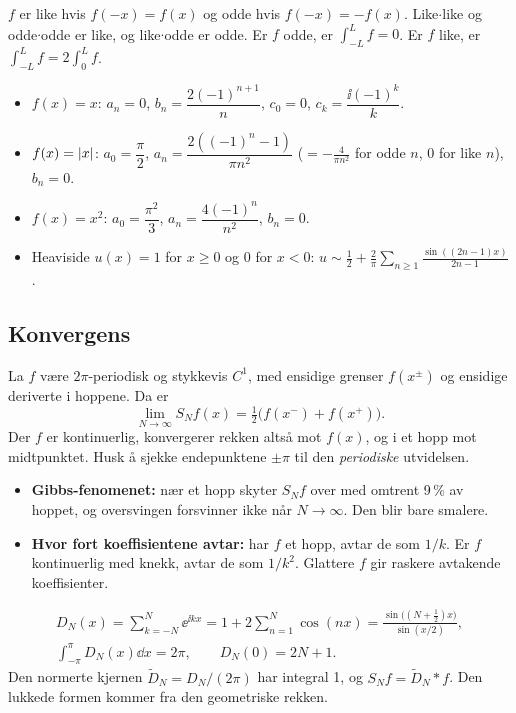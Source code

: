 \begin{defn}
$f$ er like hvis $f(-x)=f(x)$ og odde hvis $f(-x)=-f(x)$. Like$\cdot$like og odde$\cdot$odde er like, og like$\cdot$odde er odde. Er $f$ odde, er $\int_{-L}^Lf=0$. Er $f$ like, er $\int_{-L}^Lf=2\int_0^Lf$.
\end{defn}

\begin{eksempel}[{standardrekker på $[-\pi,\pi)$, kontrollregnet}]
\begin{itemize}
  \item $f(x)=x$: $a_n=0$, $b_n=\dfrac{2(-1)^{n+1}}{n}$, $c_0=0$, $c_k=\dfrac{\ii(-1)^k}{k}$.
  \item $f(x)=\lvert x\rvert$: $a_0=\dfrac\pi2$, $a_n=\dfrac{2((-1)^n-1)}{\pi n^2}$ ($=-\frac{4}{\pi n^2}$ for odde $n$, $0$ for like $n$), $b_n=0$.
  \item $f(x)=x^2$: $a_0=\dfrac{\pi^2}{3}$, $a_n=\dfrac{4(-1)^n}{n^2}$, $b_n=0$.
  \item Heaviside $u(x)=1$ for $x\ge0$ og $0$ for $x<0$: $u\sim\frac12+\frac2\pi\sum_{n\ge1}\frac{\sin((2n-1)x)}{2n-1}$.
\end{itemize}
\end{eksempel}

\subsection{Konvergens}
\begin{teorem}
La $f$ være $2\pi$-periodisk og stykkevis $C^1$, med ensidige grenser $f(x^\pm)$ og ensidige deriverte i hoppene. Da er
\[
\lim_{N\to\infty}S_Nf(x)=\tfrac12\bigl(f(x^-)+f(x^+)\bigr).
\]
Der $f$ er kontinuerlig, konvergerer rekken altså mot $f(x)$, og i et hopp mot midtpunktet. Husk å sjekke endepunktene $\pm\pi$ til den \emph{periodiske} utvidelsen.
\end{teorem}
\begin{itemize}
  \item \textbf{Gibbs-fenomenet:} nær et hopp skyter $S_Nf$ over med omtrent 9\,\% av hoppet, og oversvingen forsvinner ikke når $N\to\infty$. Den blir bare smalere.
  \item \textbf{Hvor fort koeffisientene avtar:} har $f$ et hopp, avtar de som $1/k$. Er $f$ kontinuerlig med knekk, avtar de som $1/k^2$. Glattere $f$ gir raskere avtakende koeffisienter.
\end{itemize}

\begin{defn}
\begin{gather*}
D_N(x)=\sum_{k=-N}^{N}\ee^{\ii kx}=1+2\sum_{n=1}^N\cos(nx)=\frac{\sin\bigl((N+\frac12)x\bigr)}{\sin(x/2)},\\
\int_{-\pi}^\pi D_N(x)\dd x=2\pi,\qquad D_N(0)=2N+1.
\end{gather*}
Den normerte kjernen $\tilde D_N=D_N/(2\pi)$ har integral 1, og $S_Nf=\tilde D_N*f$. Den lukkede formen kommer fra den geometriske rekken.
\end{defn}

